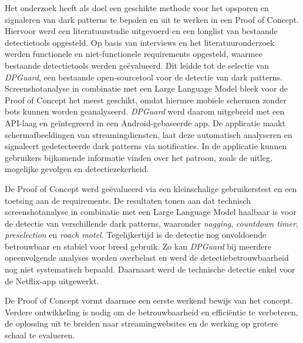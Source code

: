 \vspace{1em}

Het onderzoek heeft als doel een geschikte methode voor het opsporen en signaleren van dark patterns te bepalen en uit te werken in een Proof of Concept. Hiervoor werd een literatuurstudie uitgevoerd en een longlist van bestaande detectietools opgesteld. Op basis van interviews en het literatuuronderzoek werden functionele en niet-functionele requirements opgesteld, waarmee bestaande detectietools werden geëvalueerd. Dit leidde tot de selectie van \textit{DPGuard}, een bestaande open-sourcetool voor de detectie van dark patterns. Screenshotanalyse in combinatie met een Large Language Model bleek voor de Proof of Concept het meest geschikt, omdat hiermee mobiele schermen zonder bots kunnen worden geanalyseerd. \textit{DPGuard} werd daarom uitgebreid met een API-laag en geïntegreerd in een Android-gebaseerde app. De applicatie maakt schermafbeeldingen van streamingdiensten, laat deze automatisch analyseren en signaleert gedetecteerde dark patterns via notificaties. In de applicatie kunnen gebruikers bijkomende informatie vinden over het patroon, zoals de uitleg, mogelijke gevolgen en detectiezekerheid.

\vspace{1em}

De Proof of Concept werd geëvalueerd via een kleinschalige gebruikerstest en een toetsing aan de requirements. De resultaten tonen aan dat technisch screenshotanalyse in combinatie met een Large Language Model haalbaar is voor de detectie van verschillende dark patterns, waaronder \textit{nagging}, \textit{countdown timer}, \textit{preselection} en \textit{roach motel}. Tegelijkertijd is de detectie nog onvoldoende betrouwbaar en stabiel voor breed gebruik. Zo kan \textit{DPGuard} bij meerdere opeenvolgende analyses worden overbelast en werd de detectiebetrouwbaarheid nog niet systematisch bepaald. Daarnaast werd de technische detectie enkel voor de Netflix-app uitgewerkt.

\vspace{1em}

De Proof of Concept vormt daarmee een eerste werkend bewijs van het concept. Verdere ontwikkeling is nodig om de betrouwbaarheid en efficiëntie te verbeteren, de oplossing uit te breiden naar streamingwebsites en de werking op grotere schaal te evalueren.